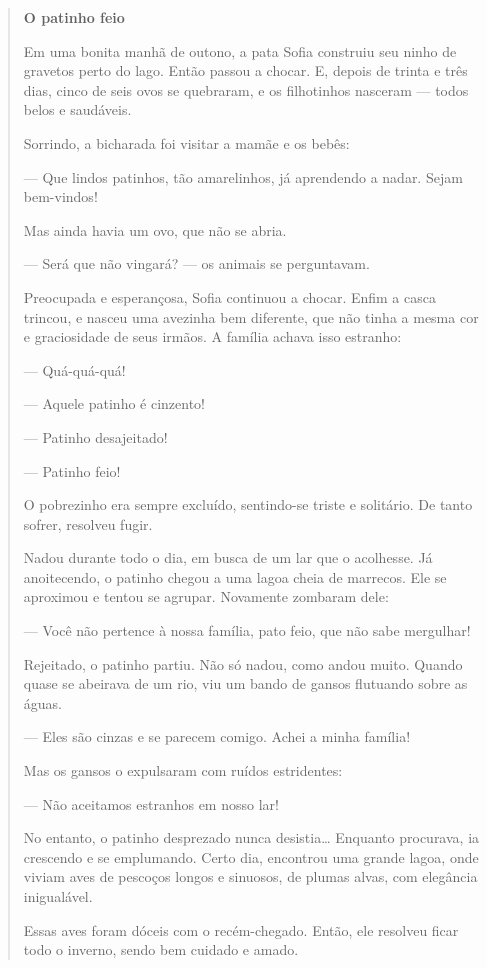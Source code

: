\begin{quote}
\textbf{O patinho feio}

Em uma bonita manhã de outono, a pata Sofia construiu seu ninho de
gravetos perto do lago. Então passou a chocar. E, depois de trinta e
três dias, cinco de seis ovos se quebraram, e os filhotinhos nasceram
--- todos belos e saudáveis.

Sorrindo, a bicharada foi visitar a mamãe e os bebês:

--- Que lindos patinhos, tão amarelinhos, já aprendendo a nadar. Sejam
bem-vindos!

Mas ainda havia um ovo, que não se abria.

--- Será que não vingará? --- os animais se perguntavam.

Preocupada e esperançosa, Sofia continuou a chocar. Enfim a casca
trincou, e nasceu uma avezinha bem diferente, que não tinha a mesma cor
e graciosidade de seus irmãos. A família achava isso estranho:

--- Quá-quá-quá!

--- Aquele patinho é cinzento!

--- Patinho desajeitado!

--- Patinho feio!

O pobrezinho era sempre excluído, sentindo-se triste e solitário. De
tanto sofrer, resolveu fugir.

Nadou durante todo o dia, em busca de um lar que o acolhesse. Já
anoitecendo, o patinho chegou a uma lagoa cheia de marrecos. Ele se
aproximou e tentou se agrupar. Novamente zombaram dele:

--- Você não pertence à nossa família, pato feio, que não sabe
mergulhar!

Rejeitado, o patinho partiu. Não só nadou, como andou muito. Quando
quase se abeirava de um rio, viu um bando de gansos flutuando sobre as
águas.

--- Eles são cinzas e se parecem comigo. Achei a minha família!

Mas os gansos o expulsaram com ruídos estridentes:

--- Não aceitamos estranhos em nosso lar!

No entanto, o patinho desprezado nunca desistia\ldots{} Enquanto procurava,
ia crescendo e se emplumando. Certo dia, encontrou uma grande lagoa,
onde viviam aves de pescoços longos e sinuosos, de plumas alvas, com
elegância inigualável.

Essas aves foram dóceis com o recém-chegado. Então, ele resolveu ficar
todo o inverno, sendo bem cuidado e amado.


\end{quote}
